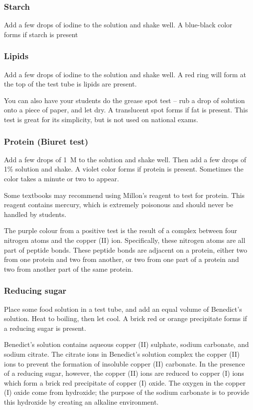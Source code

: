 \begin{itemize}
\subsubsection{Starch}
Add a few drops of iodine to the solution and shake well. A blue-black color forms if starch is present

\subsubsection{Lipids}
Add a few drops of iodine to the solution and shake well. A red ring will form at the top of the test tube is lipids are present.

You can also have your students do the grease spot test -- rub a drop of solution onto a piece of paper, and let dry. A translucent spot forms if fat is present. This test is great for its simplicity, but is not used on national exams.

\subsubsection{Protein (Biuret test)}
Add a few drops of 1~M  to the solution and shake well. Then add a few drops of 1\%  solution and shake. A violet color forms if protein is present. Sometimes the color takes a minute or two to appear. 

Some textbooks may recommend using Millon's reagent to test for protein. This reagent contains mercury, which is extremely poisonous and should never be handled by students.

The purple colour from a positive test is the result of a complex between four nitrogen atoms and the copper (II) ion. Specifically, these nitrogen atoms are all part of peptide bonds. These peptide bonds are adjacent on a protein, either two from one protein and two from another, or two from one part of a protein and two from another part of the same protein.

\subsubsection{Reducing sugar}
Place some food solution in a test tube, and add an equal volume of Benedict’s solution. Heat to boiling, then let cool. A brick red or orange precipitate forms if a reducing sugar is present.

Benedict's solution contains aqueous copper (II) sulphate, sodium carbonate, and sodium citrate. The citrate ions in Benedict's solution complex the copper (II) ions to prevent the formation of insoluble copper (II) carbonate. In the presence of a reducing sugar, however, the copper (II) ions are reduced to copper (I) ions which form a brick red precipitate of copper (I) oxide. The oxygen in the copper (I) oxide come from hydroxide; the purpose of the sodium carbonate is to provide this hydroxide by creating an alkaline environment.


\end{itemize}
